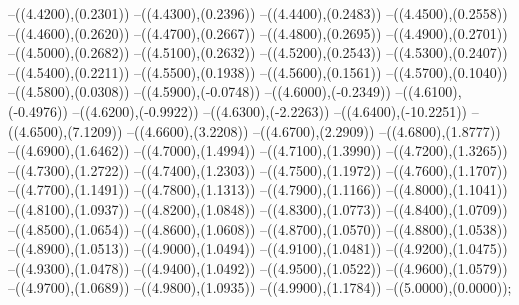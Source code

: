 {	--({\sx*(4.4200)},{\sy*(0.2301)})
	--({\sx*(4.4300)},{\sy*(0.2396)})
	--({\sx*(4.4400)},{\sy*(0.2483)})
	--({\sx*(4.4500)},{\sy*(0.2558)})
	--({\sx*(4.4600)},{\sy*(0.2620)})
	--({\sx*(4.4700)},{\sy*(0.2667)})
	--({\sx*(4.4800)},{\sy*(0.2695)})
	--({\sx*(4.4900)},{\sy*(0.2701)})
	--({\sx*(4.5000)},{\sy*(0.2682)})
	--({\sx*(4.5100)},{\sy*(0.2632)})
	--({\sx*(4.5200)},{\sy*(0.2543)})
	--({\sx*(4.5300)},{\sy*(0.2407)})
	--({\sx*(4.5400)},{\sy*(0.2211)})
	--({\sx*(4.5500)},{\sy*(0.1938)})
	--({\sx*(4.5600)},{\sy*(0.1561)})
	--({\sx*(4.5700)},{\sy*(0.1040)})
	--({\sx*(4.5800)},{\sy*(0.0308)})
	--({\sx*(4.5900)},{\sy*(-0.0748)})
	--({\sx*(4.6000)},{\sy*(-0.2349)})
	--({\sx*(4.6100)},{\sy*(-0.4976)})
	--({\sx*(4.6200)},{\sy*(-0.9922)})
	--({\sx*(4.6300)},{\sy*(-2.2263)})
	--({\sx*(4.6400)},{\sy*(-10.2251)})
	--({\sx*(4.6500)},{\sy*(7.1209)})
	--({\sx*(4.6600)},{\sy*(3.2208)})
	--({\sx*(4.6700)},{\sy*(2.2909)})
	--({\sx*(4.6800)},{\sy*(1.8777)})
	--({\sx*(4.6900)},{\sy*(1.6462)})
	--({\sx*(4.7000)},{\sy*(1.4994)})
	--({\sx*(4.7100)},{\sy*(1.3990)})
	--({\sx*(4.7200)},{\sy*(1.3265)})
	--({\sx*(4.7300)},{\sy*(1.2722)})
	--({\sx*(4.7400)},{\sy*(1.2303)})
	--({\sx*(4.7500)},{\sy*(1.1972)})
	--({\sx*(4.7600)},{\sy*(1.1707)})
	--({\sx*(4.7700)},{\sy*(1.1491)})
	--({\sx*(4.7800)},{\sy*(1.1313)})
	--({\sx*(4.7900)},{\sy*(1.1166)})
	--({\sx*(4.8000)},{\sy*(1.1041)})
	--({\sx*(4.8100)},{\sy*(1.0937)})
	--({\sx*(4.8200)},{\sy*(1.0848)})
	--({\sx*(4.8300)},{\sy*(1.0773)})
	--({\sx*(4.8400)},{\sy*(1.0709)})
	--({\sx*(4.8500)},{\sy*(1.0654)})
	--({\sx*(4.8600)},{\sy*(1.0608)})
	--({\sx*(4.8700)},{\sy*(1.0570)})
	--({\sx*(4.8800)},{\sy*(1.0538)})
	--({\sx*(4.8900)},{\sy*(1.0513)})
	--({\sx*(4.9000)},{\sy*(1.0494)})
	--({\sx*(4.9100)},{\sy*(1.0481)})
	--({\sx*(4.9200)},{\sy*(1.0475)})
	--({\sx*(4.9300)},{\sy*(1.0478)})
	--({\sx*(4.9400)},{\sy*(1.0492)})
	--({\sx*(4.9500)},{\sy*(1.0522)})
	--({\sx*(4.9600)},{\sy*(1.0579)})
	--({\sx*(4.9700)},{\sy*(1.0689)})
	--({\sx*(4.9800)},{\sy*(1.0935)})
	--({\sx*(4.9900)},{\sy*(1.1784)})
	--({\sx*(5.0000)},{\sy*(0.0000)});
}
\def\xwerteg{
\fill[color=red] (0.0000,0) circle[radius={0.07/\skala}];
\fill[color=red] (0.3571,0) circle[radius={0.07/\skala}];
\fill[color=red] (0.7143,0) circle[radius={0.07/\skala}];
\fill[color=red] (1.0714,0) circle[radius={0.07/\skala}];
\fill[color=red] (1.4286,0) circle[radius={0.07/\skala}];
\fill[color=red] (1.7857,0) circle[radius={0.07/\skala}];
\fill[color=red] (2.1429,0) circle[radius={0.07/\skala}];
\fill[color=red] (2.5000,0) circle[radius={0.07/\skala}];
\fill[color=red] (2.8571,0) circle[radius={0.07/\skala}];
\fill[color=red] (3.2143,0) circle[radius={0.07/\skala}];
\fill[color=red] (3.5714,0) circle[radius={0.07/\skala}];
\fill[color=red] (3.9286,0) circle[radius={0.07/\skala}];
\fill[color=red] (4.2857,0) circle[radius={0.07/\skala}];
\fill[color=red] (4.6429,0) circle[radius={0.07/\skala}];
\fill[color=red] (5.0000,0) circle[radius={0.07/\skala}];
}
